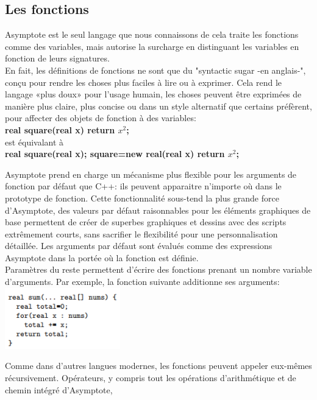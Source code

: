 \documentclass[a4paper]{report}
\begin{document}
\subsection{Les fonctions}
Asymptote est le seul langage que nous connaissons de cela
traite les fonctions comme des variables, mais autorise la surcharge
en distinguant les variables en fonction de leurs signatures.\\
En fait, les définitions de fonctions ne sont que du "syntactic sugar -en anglais-", conçu pour rendre les choses plus faciles à lire ou à exprimer. Cela rend le langage «plus doux» pour l'usage humain, les choses peuvent être exprimées de manière plus claire, plus concise ou dans un style alternatif que certains préfèrent, pour affecter des objets de fonction à des variables:\smallskip\\
\textbf{real square(real x) return $x^2$;}\\
est équivalant à\\
\textbf{real square(real x);  square=new real(real x) return $x^2$;}\smallskip\\
 \par Asymptote prend en charge un mécanisme plus flexible pour les arguments de fonction par défaut que C++: ils peuvent apparaitre n'importe où dans le prototype de fonction. Cette fonctionnalité sous-tend la plus grande force d'Asymptote, des valeurs par défaut raisonnables pour les éléments graphiques de base permettent de créer de superbes graphiques et dessins avec des scripts extrêmement courts, sans sacrifier le flexibilité pour une personnalisation détaillée. Les arguments par défaut sont évalués comme des expressions Asymptote dans la portée où la fonction est définie.\\
Paramètres du reste permettent d'écrire des fonctions prenant un nombre variable d'arguments. Par exemple, la fonction suivante additionne ses arguments:\\
\includegraphics[width=5cm]{images/cap2.png}\\
\par Comme dans d'autres langues modernes, les fonctions peuvent appeler
eux-mêmes récursivement. Opérateurs, y compris tout les opérations d'arithmétique et de chemin intégré d'Asymptote,
\end{document}

